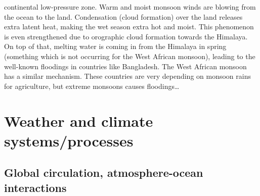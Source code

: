 \documentclass[oneside]{book}
\begin{document}
\begin{itemize}
  continental low-pressure zone. Warm and moist monsoon winds are
  blowing from the ocean to the land. Condensation (cloud formation)
  over the land releases extra latent heat, making the wet season extra
  hot and moist. This phenomenon is even strengthened due to orographic
  cloud formation towards the Himalaya. On top of that, melting water is
  coming in from the Himalaya in spring (something which is not
  occurring for the West African monsoon), leading to the well-known
  floodings in countries like Bangladesh. The West African monsoon has a
  similar mechanism. These countries are very depending on monsoon rains
  for agriculture, but extreme monsoons causes floodings\ldots{}
\end{itemize}

\part{Weather and climate
systems/processes}\label{part-weather-and-climate-systemsprocesses}

\chapter{Global circulation, atmosphere-ocean interactions}\label{GC}



\end{document}

